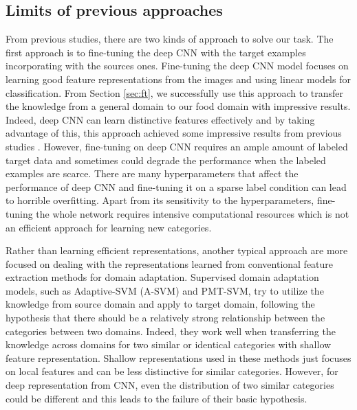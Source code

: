 \subsection{Limits of previous approaches}
From previous studies, there are two kinds of approach to solve our task. The first approach is to fine-tuning the deep CNN with the target examples incorporating with the sources ones.
Fine-tuning the deep CNN model focuses on learning good feature representations from the images and using linear models for classification. From Section \ref{sec:ft}, we successfully use this approach to transfer the knowledge from a general domain to our food domain with impressive results. Indeed, deep CNN can learn distinctive features effectively and by taking advantage of this, this approach achieved some impressive results from previous studies\cite{Chatfield14} \cite{zeiler2014visualizing}. However, fine-tuning on deep CNN requires an ample amount of labeled target data and sometimes could degrade the performance when the labeled examples are scarce\cite{hoffman2013one}. There are many hyperparameters that affect the performance of deep CNN and fine-tuning it on a sparse label condition can lead to horrible overfitting. Apart from its sensitivity to the hyperparameters, fine-tuning the whole network requires intensive computational resources which is not an efficient approach for learning new categories.

Rather than learning efficient representations, another typical approach are more focused on dealing with the representations learned from conventional feature extraction methods for domain adaptation. Supervised domain adaptation models, such as Adaptive-SVM (A-SVM) and PMT-SVM, try to utilize the knowledge from source domain and apply to target domain, following the hypothesis that there should be a relatively strong relationship between the categories between two domains\cite{yang2007adapting}\cite{aytar2011tabula}. Indeed, they work well when transferring the knowledge across domains for two similar or identical categories with shallow feature representation. Shallow representations used in these methods just focuses on local features and can be less distinctive for similar categories. However, for deep representation from CNN, even the distribution of two similar categories could be different and this leads to the failure of their basic hypothesis.

